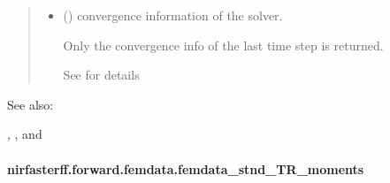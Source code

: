 \documentclass[letterpaper,10pt,english]{sphinxmanual}
\begin{document}
\begin{fulllineitems}
\begin{quote}
\begin{description}
\begin{itemize}
\sphinxAtStartPar
If mesh.vol is defined and , the returned internal TPSFs will be in volumetric space

\sphinxAtStartPar
See {\hyperref[\detokenize{_autosummary/nirfasterff.base.data.TPSFdata:nirfasterff.base.data.TPSFdata}]{}} for details.

\item {} 
\sphinxAtStartPar
{} () \textendash{} convergence information of the solver.

\sphinxAtStartPar
Only the convergence info of the last time step is returned.

\sphinxAtStartPar
See {\hyperref[\detokenize{_autosummary/nirfasterff.utils.ConvergenceInfo:nirfasterff.utils.ConvergenceInfo}]{}} for details

\end{itemize}


\end{description}\end{quote}


\begin{sphinxseealso}{See also:}

\sphinxAtStartPar
{\hyperref[\detokenize{_autosummary/nirfasterff.math.gen_mass_matrix:nirfasterff.math.gen_mass_matrix}]{}}, {\hyperref[\detokenize{_autosummary/nirfasterff.math.gen_sources:nirfasterff.math.gen_sources}]{}}, and {\hyperref[\detokenize{_autosummary/nirfasterff.math.get_field_TR:nirfasterff.math.get_field_TR}]{}}


\end{sphinxseealso}


\end{fulllineitems}


\sphinxstepscope


\paragraph{nirfasterff.forward.femdata.femdata\_stnd\_TR\_moments}
\label{\detokenize{_autosummary/nirfasterff.forward.femdata.femdata_stnd_TR_moments:nirfasterff-forward-femdata-femdata-stnd-tr-moments}}\label{\detokenize{_autosummary/nirfasterff.forward.femdata.femdata_stnd_TR_moments::doc}}
\end{document}

